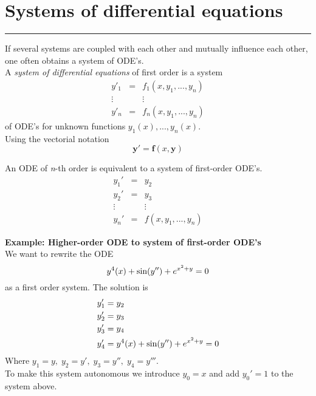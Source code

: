 \section{Systems of differential equations}
\noindent\rule[\linienAbstand]{\linewidth}{\linienDickeDick}
If several systems are coupled with each other and mutually influence each other, one often obtains a system of ODE’s.\\
A \emph{system of differential equations} of first order is a system
\begin{equation}
  \begin{matrix}
    y'_1 & = & f_1(x, y_1,...,y_n)\\
    \vdots & & \vdots \;\;\;\;\; \; \; \; \; \; \; \; \; \; \; \; \; \; \\
    y'_n & = & f_n(x, y_1,...,y_n)
\end{matrix}
\end{equation}
of ODE’s for unknown functions $y_1(x), ... , y_n(x)$.\\
Using the vectorial notation
\begin{equation}
  \mathbf{y}' = \mathbf{f}(x, \mathbf{y})
\end{equation}

An ODE of \emph{n}-th order is equivalent to a system of first-order ODE's.
\begin{equation}
  \begin{matrix}
    y_1' & = & y_2\\
    y_2' & = & y_3\\
    \vdots  &  & \vdots \\
    y_n' & = & f(x, y_1, ..., y_n)
  \end{matrix}
\end{equation}

\textbf{Example: Higher-order ODE to system of first-order ODE's}\\
We want to rewrite the ODE
\begin{equation}
  y^4(x) + \textup{sin}(y'') + e^{x^2 + y} = 0
\end{equation}
as a first order system. The solution is
\begin{equation}
  \begin{split}
    y_1' &= y_2\\
    y_2' &= y_3\\
    y_3' &= y_4 \\
    y_4' &= y^4(x) + \textup{sin}(y'') + e^{x^2 + y} = 0
  \end{split}
\end{equation}
Where $y_1 = y,\; y_2 = y',\; y_3 = y'',\; y_4 = y'''$.\\
To make this system autonomous we introduce $y_0 = x$ and add $y_0' = 1$ to the system above.\\

